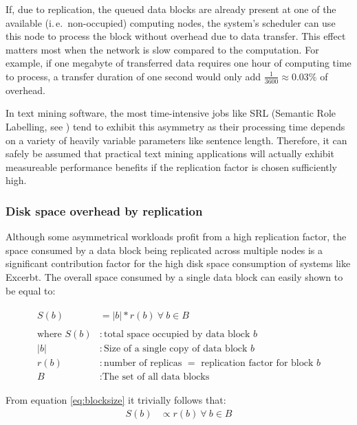 \documentclass[a4paper, 12pt, twoside, reqn]{report}
\numberwithin{figure}{chapter}
\newtheorem[L]{boxedDefinition}{Definition}
\newtheorem[L]{boxedExample}{Example}
\newcommand{\ie}{i.\,e.\ }
\begin{document}
If, due to replication, the queued data blocks are already present at one of the available (\ie non-occupied) computing nodes, the system's scheduler can use this node to process the block without overhead due to data transfer. This effect matters most when the network is slow compared to the computation. For example, if one megabyte of transferred data requires one hour of computing time to process, a transfer duration of one second would only add $\frac{1}{3600} \approx 0.03\%$ of overhead.

In text mining software, the most time-intensive jobs like SRL (Semantic Role Labelling, see \cite[section 4.4]{wachinger2013next}) tend to exhibit this asymmetry as their processing time depends on a variety of heavily variable parameters like sentence length. Therefore, it can safely be assumed that practical text mining applications will actually exhibit measureable performance benefits if the replication factor is chosen sufficiently high.

\subsubsection{Disk space overhead by replication}\label{sssec:replication-disk-overhead}

Although some asymmetrical workloads profit from a high replication factor, the space consumed by a data block being replicated across multiple nodes is a significant contribution factor for the high disk space consumption of systems like Excerbt. The overall space consumed by a single data block can easily shown to be equal to:

\begin{align}\label{eq:blocksize}
\begin{split}
 S(b) &= |b| * r(b)\ \forall\ b \in B\\\\
 \text{where~} S(b) &: \text{total space occupied by data block $b$}\\
 |b| &: \text{Size of a single copy of data block $b$}\\
 r(b) &: \text{number of replicas $=$ replication factor for block $b$}\\
 B &: \text{The set of all data blocks}
\end{split}
\end{align}

{\setlength{\parindent}{0cm} From equation \eqref{eq:blocksize} it trivially follows that:}
\begin{align}\label{eq:blocksize2}
S(b) &\propto r(b)\ \forall\ b \in B
\end{align}
\end{document}
